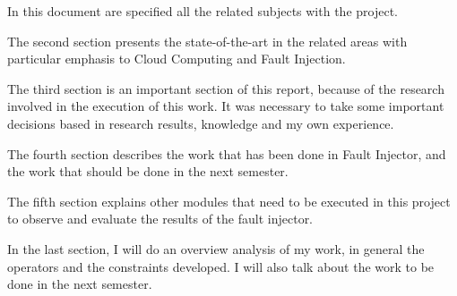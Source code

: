 In this document are specified all the related subjects with the project.

The second section presents the state-of-the-art in the related areas with particular emphasis to Cloud Computing and Fault Injection.

The third section is an important section of this report, because of the research involved in the execution of this work. It was necessary to take some important decisions based in research results, knowledge and my own experience.

The fourth section describes the work that has been done in Fault Injector, and the work that should be done in the next semester.

The fifth section explains other modules that need to be executed in this project to observe and evaluate the results of the fault injector.

In the last section, I will do an overview analysis of my work, in general the operators and the constraints developed. I will also talk about the work to be done in the next semester.


